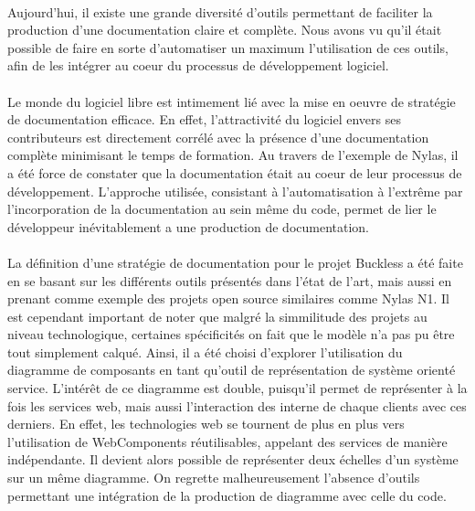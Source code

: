 \paragraph{}
    Aujourd'hui, il existe une grande diversité d'outils permettant de faciliter la production d'une
    documentation claire et complète. Nous avons vu qu'il était possible de faire en sorte d'automatiser
    un maximum l'utilisation de ces outils, afin de les intégrer au coeur du processus de développement
    logiciel.

\paragraph{}
    Le monde du logiciel libre est intimement lié avec la mise en oeuvre de stratégie de documentation
    efficace. En effet, l'attractivité du logiciel envers ses contributeurs est directement corrélé
    avec la présence d'une documentation complète minimisant le temps de formation.
    Au travers de l'exemple de Nylas, il a été force de constater que la documentation était au coeur
    de leur processus de développement. L'approche utilisée, consistant à l'automatisation à l'extrême
    par l'incorporation de la documentation au sein même du code, permet de lier le développeur
    inévitablement a une production de documentation.

\paragraph{}
    La définition d'une stratégie de documentation pour le projet Buckless a été faite en se basant
    sur les différents outils présentés dans l'état de l'art, mais aussi en prenant comme exemple
    des projets open source similaires comme Nylas N1. Il est cependant important de noter que malgré
    la simmilitude des projets au niveau technologique, certaines spécificités on fait que le modèle
    n'a pas pu être tout simplement calqué. Ainsi, il a été choisi d'explorer l'utilisation du
    diagramme de composants en tant qu'outil de représentation de système orienté service.
    L'intérêt de ce diagramme est double, puisqu'il permet de représenter à la fois les services
    web, mais aussi l'interaction des interne de chaque clients avec ces derniers.
    En effet, les technologies web se tournent de plus en plus vers l'utilisation de WebComponents
    réutilisables, appelant des services de manière indépendante. Il devient alors possible de représenter
    deux échelles d'un système sur un même diagramme. On regrette malheureusement l'absence d'outils
    permettant une intégration de la production de diagramme avec celle du code.

